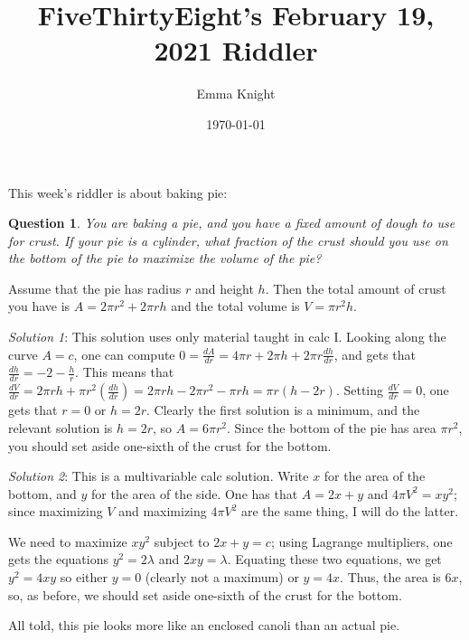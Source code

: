 \documentclass[11pt]{article}
\title{FiveThirtyEight's February 19, 2021 Riddler}
\author{Emma Knight}
\date{\today}
\newtheorem{question}[theorem]{Question}
\theoremstyle{definition}
\begin{document}
\maketitle
This week's riddler is about baking pie:
\begin{question}
You are baking a pie, and you have a fixed amount of dough to use for crust.  If your pie is a cylinder, what fraction of the crust should you use on the bottom of the pie to maximize the volume of the pie?
\end{question}
Assume that the pie has radius $r$ and height $h$.  Then the total amount of crust you have is $A = 2\pi r^2 + 2\pi rh$ and the total volume is $V = \pi r^2 h$.

\emph{Solution 1}: This solution uses only material taught in calc I.  Looking along the curve $A = c$, one can compute $0 = \frac{dA}{dr} = 4\pi r + 2\pi h + 2\pi r\frac{dh}{dr}$, and gets that $\frac{dh}{dr} = -2-\frac{h}{r}$.  This means that $\frac{dV}{dr} = 2\pi rh + \pi r^2\left(\frac{dh}{dr}\right) = 2\pi rh - 2\pi r^2 - \pi rh = \pi r(h-2r)$.  Setting $\frac{dV}{dr} = 0$, one gets that $r = 0$ or $h = 2r$.  Clearly the first solution is a minimum, and the relevant solution is $h = 2r$, so $A = 6\pi r^2$.  Since the bottom of the pie has area $\pi r^2$, you should set aside one-sixth of the crust for the bottom.

\emph{Solution 2}: This is a multivariable calc solution.  Write $x$ for the area of the bottom, and $y$ for the area of the side.  One has that $A = 2x + y$ and $4\pi V^2 = xy^2$; since maximizing $V$ and maximizing $4\pi V^2$ are the same thing, I will do the latter.

We need to maximize $xy^2$ subject to $2x+y = c$; using Lagrange multipliers, one gets the equations $y^2 = 2\lambda$ and $2xy = \lambda$.  Equating these two equations, we get $y^2 = 4xy$ so either $y = 0$ (clearly not a maximum) or $y = 4x$.  Thus, the area is $6x$, so, as before, we should set aside one-sixth of the crust for the bottom.

All told, this pie looks more like an enclosed canoli than an actual pie.
\end{document}
